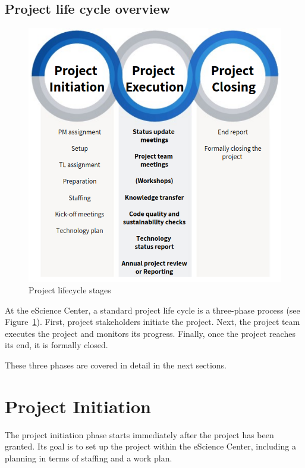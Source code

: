 \documentclass[11pt]{article}
\begin{document}
\clearpage
\subsection{Project life cycle overview}
\label{sec:scope:lifecycle}

\begin{figure}[!h]
    \centering
    \includegraphics[scale=0.5]{img/lifecycle-stages.png}
    \caption{Project lifecycle stages}
    \label{fig:project-lifecycle}
\end{figure}

At the eScience Center, a standard project life cycle is a three-phase process (see Figure~\ref{fig:project-lifecycle}). First, project stakeholders initiate the
project. Next, the project team executes the project and monitors its progress. Finally, once the project reaches its
end, it is formally closed.

These three phases are covered in detail in the next sections.

\clearpage
\section{Project Initiation}
\label{sec:init}
The project initiation phase starts immediately after the project has been granted. Its goal is to set up the project
within the eScience Center, including a planning in terms of staffing and a work plan.
\end{document}

